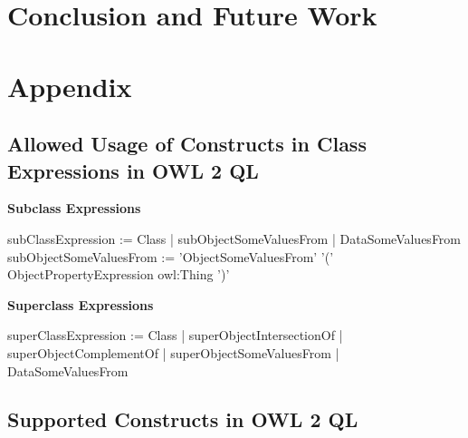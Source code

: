 \documentclass{llncs}
\begin{document}
\section{Conclusion and Future Work}

\section{Appendix}


\subsection{Allowed Usage of Constructs in Class Expressions in OWL 2 QL}

\textbf{Subclass Expressions}

\begin{ex}
subClassExpression :=
    Class |
    subObjectSomeValuesFrom | DataSomeValuesFrom
subObjectSomeValuesFrom := 'ObjectSomeValuesFrom' '(' ObjectPropertyExpression owl:Thing ')'
\end{ex}

\textbf{Superclass Expressions}

\begin{ex}
superClassExpression :=
    Class |
    superObjectIntersectionOf | superObjectComplementOf |
    superObjectSomeValuesFrom | DataSomeValuesFrom
\end{ex}
 
\subsection{Supported Constructs in OWL 2 QL}
\end{document}
